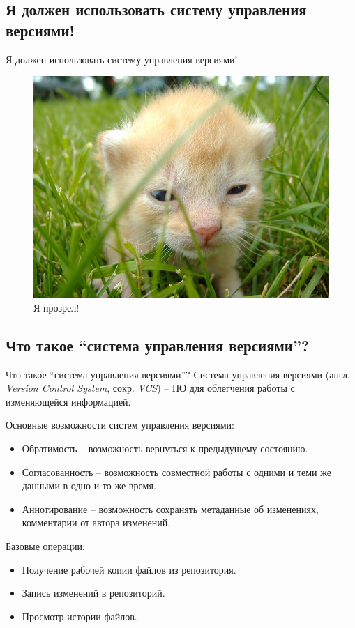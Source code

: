 \documentclass[presentation]{beamer}
\begin{document}
\subsection{Я должен использовать систему управления версиями!}
\begin{frame}{Я должен использовать систему управления версиями!}
  \begin{figure}[htb]
    \centering \includegraphics[width=.9\textwidth]{youngkitten}
    \caption{\LARGE Я прозрел!}
  \end{figure}
\end{frame}



\subsection{Что такое ``система управления версиями''?}

\begin{frame}{Что такое ``система управления версиями''?}
  \raisebox{-.30em}{\Large\HandRight}\hspace{.25em} Система управления
  версиями (англ. \emph{Version Control System}, сокр. \emph{VCS}) --
  ПО для облегчения работы с изменяющейся информацией. \vspace{1em}

  Основные возможности систем управления версиями:
  \begin{itemize}
  \item \alert{Обратимость} -- возможность вернуться к предыдущему
    состоянию.
  \item \alert{Согласованность} -- возможность совместной работы с
    одними и теми же данными в одно и то же время.
  \item \alert{Аннотирование} -- возможность сохранять метаданные об
    изменениях, комментарии от автора изменений.
  \end{itemize}

  \medskip

  Базовые операции:
  \begin{itemize}
  \item Получение рабочей копии файлов из репозитория.
  \item Запись изменений в репозиторий.
  \item Просмотр истории файлов.
  \end{itemize}
\end{frame}
\end{document}
